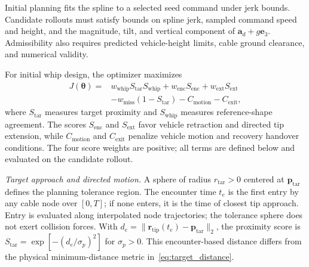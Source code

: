 Initial planning fits the spline to a selected seed command under
jerk bounds. Candidate rollouts must satisfy bounds on spline jerk,
sampled command speed and height, and the magnitude, tilt, and
vertical component of $\mathbf a_d+g\mathbf e_3$.
Admissibility also requires predicted vehicle-height limits,
cable ground clearance, and numerical validity.

For initial whip design, the optimizer maximizes
\begin{equation}
\begin{aligned}
J(\boldsymbol\theta)
={}&w_{\mathrm{whip}}S_{\mathrm{tar}}S_{\mathrm{whip}}
+w_{\mathrm{enc}}S_{\mathrm{enc}}+w_{\mathrm{ext}}S_{\mathrm{ext}}\\
&-w_{\mathrm{miss}}(1-S_{\mathrm{tar}})
-C_{\mathrm{motion}}-C_{\mathrm{exit}},
\end{aligned}
\label{eq:planning_score}
\end{equation}
where $S_{\mathrm{tar}}$ measures target proximity and $S_{\mathrm{whip}}$
measures reference-shape agreement. The scores $S_{\mathrm{enc}}$
and $S_{\mathrm{ext}}$ favor vehicle retraction and directed tip
extension, while $C_{\mathrm{motion}}$ and $C_{\mathrm{exit}}$
penalize vehicle motion and recovery handover conditions.
The four score weights are positive; all terms are defined below
and evaluated on the candidate rollout.

\noindent\emph{Target approach and directed motion.}
A sphere of radius $r_{\mathrm{tar}}>0$ centered at
$\mathbf p_{\mathrm{tar}}$ defines the planning tolerance region.
The encounter time $t_e$ is the first entry by any cable node
over $[0,T]$; if none enters, it is the time of closest tip
approach. Entry is evaluated along interpolated node trajectories;
the tolerance sphere does not exert collision forces. With
$d_e=\|\mathbf r_{\mathrm{tip}}(t_e)-\mathbf p_{\mathrm{tar}}\|_2$,
the proximity score is $S_{\mathrm{tar}}=\exp[-(d_e/\sigma_p)^2]$ for
$\sigma_p>0$. This encounter-based distance differs from the
physical minimum-distance metric in~\eqref{eq:target_distance}.

